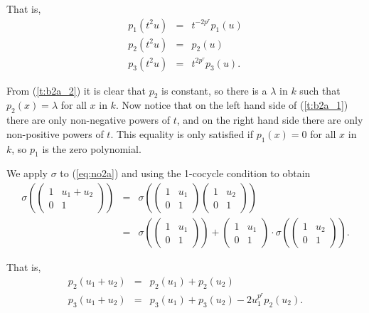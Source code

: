 That is,
\begin{eqnarray}
\label{t:b2a_1}
p_1(t^2u) &=& t^{-2p^r} p_1(u) \\
\label{t:b2a_2}
p_2(t^2u) &=& p_2(u) \\
\label{t:b2a_3}
p_3(t^2u) &=&  t^{2p^r}p_3(u).
\end{eqnarray}

From (\ref{t:b2a_2}) it is clear that $p_2$ is constant, so there is a $\lambda$ in $k$ such that $p_2(x)=\lambda$ for all $x$ in $k$. Now notice that on the left hand side of (\ref{t:b2a_1}) there are only non-negative powers of $t$, and on the right hand side there are only non-positive powers of $t$. This equality is only satisfied if $p_1(x)=0$ for all $x$ in $k$, so $p_1$ is the zero polynomial.

We apply $\sigma$ to (\ref{eq:no2a}) and using the 1-cocycle condition to obtain
\begin{eqnarray*}
\sigma\left(
	\left(\begin{matrix} 1 & u_1 + u_2 \\ 0 & 1 \end{matrix}\right)
\right)
&=&
\sigma\left(
	\left(\begin{matrix} 1 & u_1 \\ 0 & 1 \end{matrix}\right) 
	\left(\begin{matrix} 1 & u_2 \\ 0 & 1 \end{matrix}\right)
\right) \\
&=&
\sigma\left(
	\left(\begin{matrix} 1 & u_1 \\ 0 & 1 \end{matrix}\right)
\right) +
\left(\begin{matrix} 1 & u_1 \\ 0 & 1 \end{matrix}\right) \cdot
\sigma\left(
	\left(\begin{matrix} 1 & u_2 \\ 0 & 1 \end{matrix}\right)
\right).
\end{eqnarray*}

That is,
\begin{eqnarray}
\label{u:b2a_1}
p_2(u_1 + u_2) &=& p_2(u_1) + p_2(u_2) \\
\label{u:b2a_2}
p_3(u_1 + u_2) &=& p_3(u_1) + p_3(u_2) - 2u_1^{p^r}p_2(u_2).
\end{eqnarray}


